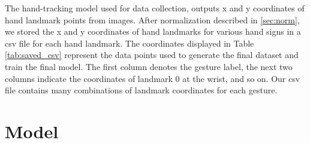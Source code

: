 The hand-tracking model used for data collection, outputs x and y coordinates of hand landmark points from images. After normalization described in \ref{sec:norm}, we stored the x and y coordinates of hand landmarks for various hand signs in a csv file for each hand landmark. The coordinates displayed in Table \ref{tab:saved_csv} represent the data points used to generate the final dataset and train the final model. The first column denotes the gesture label, the next two columns indicate the coordinates of landmark 0 at the wrist, and so on. Our csv file contains many combinations of landmark coordinates for each gesture.

 



\section{Model}
